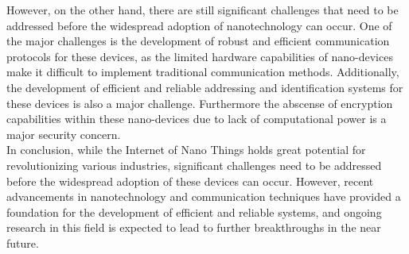 \documentclass{report}
\begin{document}
    However, on the other hand, there are still significant challenges that need to be addressed before the widespread adoption of nanotechnology can occur. One of the major challenges is the development of robust and efficient communication protocols for these devices, as the limited hardware capabilities of nano-devices make it difficult to implement traditional communication methods. Additionally, the development of efficient and reliable addressing and identification systems for these devices is also a major challenge. Furthermore the abscense of encryption capabilities within these nano-devices due to lack of computational power is a major security concern.\\

    In conclusion, while the Internet of Nano Things holds great potential for revolutionizing various industries, significant challenges need to be addressed before the widespread adoption of these devices can occur. However, recent advancements in nanotechnology and communication techniques have provided a foundation for the development of efficient and reliable systems, and ongoing research in this field is expected to lead to further breakthroughs in the near future.



\end{document}
